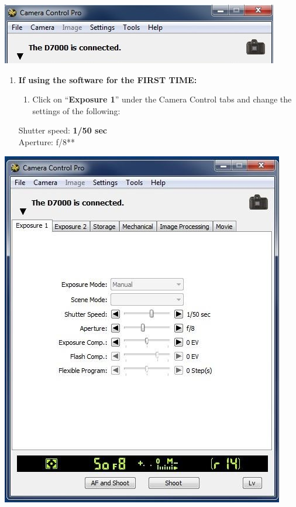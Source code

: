 \documentclass[]{book}
\providecommand{\tightlist}{%
  \setlength{\itemsep}{0pt}\setlength{\parskip}{0pt}}
\begin{document}
\includegraphics{images/Camera2.jpg}

\begin{enumerate}
\def\labelenumi{\arabic{enumi}.}
\setcounter{enumi}{4}
\item
  \textbf{If using the software for the FIRST TIME:}

  \begin{enumerate}
  \def\labelenumii{\alph{enumii})}
  \tightlist
  \item
    Click on ``\textbf{Exposure 1}'' under the Camera Control tabs and change the settings of the following:
  \end{enumerate}

  Shutter speed: \textbf{1/50 sec}\\
  Aperture: f/8**
\end{enumerate}

\includegraphics{images/Camera3.jpg}
\end{document}
